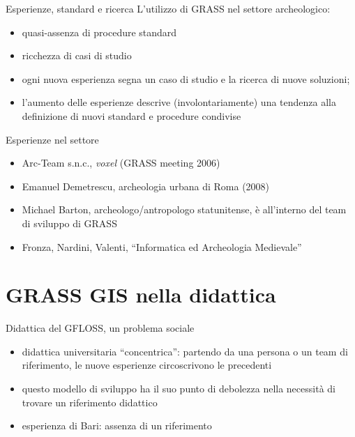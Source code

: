 \documentclass[xcolor=svgnames]{beamer}
\begin{document}

		\begin{frame}{Esperienze, standard e ricerca}
			L'utilizzo di GRASS nel settore archeologico:
			\begin{itemize}
				\item quasi-assenza di \alert{procedure standard}
				\item ricchezza di \alert{casi di studio}
				\item ogni nuova esperienza segna un caso di studio e la ricerca di nuove soluzioni;
				\item l'aumento delle esperienze descrive (involontariamente) una tendenza alla definizione di nuovi standard e procedure condivise
			\end{itemize}
		\end{frame}


		\begin{frame}{Esperienze nel settore}
			\begin{itemize}
				\item Arc-Team s.n.c., \emph{voxel} (GRASS meeting 2006)
				\item Emanuel Demetrescu, archeologia urbana di Roma (2008)
				\item Michael Barton, archeologo/antropologo statunitense, è all'interno del team di sviluppo di GRASS
				\item Fronza, Nardini, Valenti, ``Informatica ed Archeologia Medievale''
			\end{itemize}
		\end{frame}

	\section{GRASS GIS nella didattica}

		\begin{frame}{Didattica del GFLOSS, un problema sociale}
			\begin{itemize}
				\item didattica universitaria ``concentrica'': partendo da una persona o un team di riferimento, le nuove esperienze circoscrivono le precedenti
				\item questo modello di sviluppo ha il suo punto di debolezza nella necessità di trovare un riferimento didattico
				\item esperienza di Bari: assenza di un riferimento
			\end{itemize}
		\end{frame}
\end{document}
